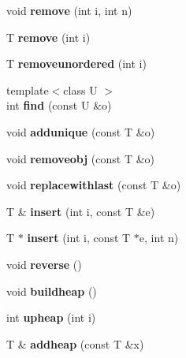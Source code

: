 \begin{DoxyCompactItemize}
void {\bfseries remove} (int i, int n)
\item 
\mbox{\label{structvector_a515096bf4dcf9d9aeda81ece3c8b24b6}} 
T {\bfseries remove} (int i)
\item 
\mbox{\label{structvector_a6a92723c52a0b1a02c2ad43e2a7672de}} 
T {\bfseries removeunordered} (int i)
\item 
\mbox{\label{structvector_a6189bf4fa76f6304289a706b8b81767e}} 
{\footnotesize template$<$class U $>$ }\\int {\bfseries find} (const U \&o)
\item 
\mbox{\label{structvector_a6228008b964380b3e519a9949efda079}} 
void {\bfseries addunique} (const T \&o)
\item 
\mbox{\label{structvector_a10daba22a06b056f79048f614dccbd52}} 
void {\bfseries removeobj} (const T \&o)
\item 
\mbox{\label{structvector_a5f1fe4bf71fda4f1f9fa65d7e810e6c4}} 
void {\bfseries replacewithlast} (const T \&o)
\item 
\mbox{\label{structvector_adc0841f7a1df685c56dd4ab3aaf3c499}} 
T \& {\bfseries insert} (int i, const T \&e)
\item 
\mbox{\label{structvector_a38fa525b600c8efc6c1da1ac93caace5}} 
T $\ast$ {\bfseries insert} (int i, const T $\ast$e, int n)
\item 
\mbox{\label{structvector_a34d321ce952d2ac32c673623cb8cdb63}} 
void {\bfseries reverse} ()
\item 
\mbox{\label{structvector_a4a20cf726867fca1a00b90aaa2f43893}} 
void {\bfseries buildheap} ()
\item 
\mbox{\label{structvector_aadd16b607b5ed81b7e3a7ba5617712dd}} 
int {\bfseries upheap} (int i)
\item 
\mbox{\label{structvector_a68007f6136a4d48d868c47ab692ac4c2}} 
T \& {\bfseries addheap} (const T \&x)

\end{DoxyCompactItemize}

